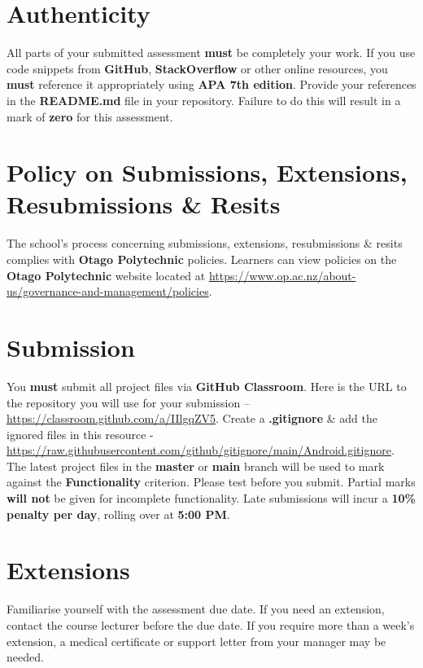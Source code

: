 \documentclass{article}
\begin{document}
\section*{Authenticity}
All parts of your submitted assessment \textbf{must} be completely your work. If you use code snippets from \textbf{GitHub}, \textbf{StackOverflow} or other online resources, you \textbf{must} reference it appropriately using \textbf{APA 7th edition}. Provide your references in the \textbf{README.md} file in your repository. Failure to do this will result in a mark of \textbf{zero} for this assessment.

\section*{Policy on Submissions, Extensions, Resubmissions \& Resits}
The school's process concerning submissions, extensions, resubmissions \& resits complies with \textbf{Otago Polytechnic} policies. Learners can view policies on the \textbf{Otago Polytechnic} website located at \href{https://www.op.ac.nz/about-us/governance-and-management/policies}{https://www.op.ac.nz/about-us/governance-and-management/policies}.

\section*{Submission}
You \textbf{must} submit all project files via \textbf{GitHub Classroom}. Here is the URL to the repository you will use for your submission – \href{https://classroom.github.com/a/IIlgqZV5}{https://classroom.github.com/a/IIlgqZV5}.  Create a \textbf{.gitignore} \& add the ignored files in this resource - \href{https://raw.githubusercontent.com/github/gitignore/main/Android.gitignore}{https://raw.githubusercontent.com/github/gitignore/main/Android.gitignore}. The latest project files in the \textbf{master} or \textbf{main} branch will be used to mark against the \textbf{Functionality} criterion. Please test before you submit. Partial marks \textbf{will not} be given for incomplete functionality. Late submissions will incur a \textbf{10\% penalty per day}, rolling over at \textbf{5:00 PM}.

\section*{Extensions}
Familiarise yourself with the assessment due date. If you need an extension, contact the course lecturer before the due date. If you require more than a week's extension, a medical certificate or support letter from your manager may be needed.
\end{document}
